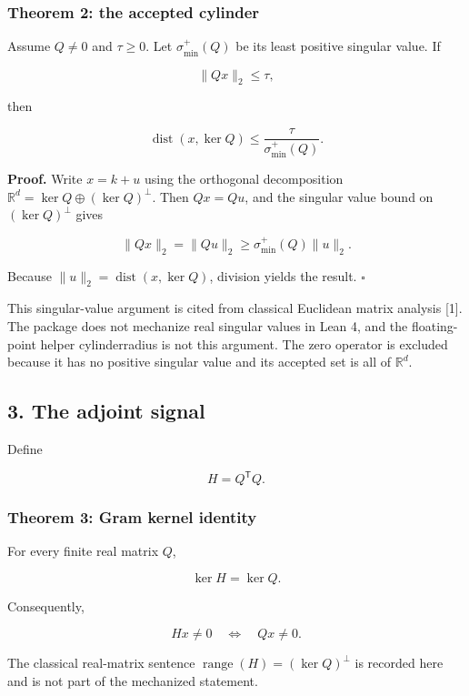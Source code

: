 \documentclass[
  11pt,
]{article}
\theoremstyle{plain}
\theoremstyle{definition}\newtheorem{definition}[theorem]{Definition}
\theoremstyle{remark}\newtheorem*{remark}{Remark}
\DeclareRobustCommand{\texttt}[1]{%
  \ifmmode
    \mathtt{#1}%
  \else
    {\ttfamily\small\renewcommand{\_}{\symbol{95}\allowbreak}#1}%
  \fi}
\begin{document}
\subsubsection{Theorem 2: the accepted cylinder}\label{theorem-2-the-accepted-cylinder}

Assume \(Q\neq 0\) and \(\tau\geq 0\). Let \(\sigma_{\min}^{+}(Q)\) be its least positive
singular value. If

\[
\lVert Qx\rVert_2\leq \tau,
\]

then

\[
\operatorname{dist}(x,\ker Q)
\leq \frac{\tau}{\sigma_{\min}^{+}(Q)}.
\]

\textbf{Proof.} Write \(x=k+u\) using the orthogonal decomposition
\(\mathbb R^d=\ker Q\oplus(\ker Q)^\perp\). Then \(Qx=Qu\), and the singular
value bound on \((\ker Q)^\perp\) gives

\[
\lVert Qx\rVert_2=\lVert Qu\rVert_2
\geq \sigma_{\min}^{+}(Q)\lVert u\rVert_2.
\]

Because \(\lVert u\rVert_2=\operatorname{dist}(x,\ker Q)\), division yields
the result. \(\square\)

This singular-value argument is cited from classical Euclidean matrix analysis {[}1{]}.
The package does not mechanize real singular
values in Lean 4, and the floating-point helper \texttt{cylinder\_radius} is not this
argument. The zero operator is excluded because it has no positive singular
value and its accepted set is all of \(\mathbb R^d\).

\subsection{3. The adjoint signal}\label{the-adjoint-signal}

Define

\[
H=Q^{\mathsf T}Q.
\]

\subsubsection{Theorem 3: Gram kernel identity}\label{theorem-3-gram-kernel-identity}

For every finite real matrix \(Q\),

\[
\ker H=\ker Q.
\]

Consequently,

\[
Hx\neq 0\quad\Longleftrightarrow\quad Qx\neq 0.
\]

The classical real-matrix sentence
\(\operatorname{range}(H)=(\ker Q)^\perp\)
is recorded here and is not part of the mechanized statement.
\end{document}
